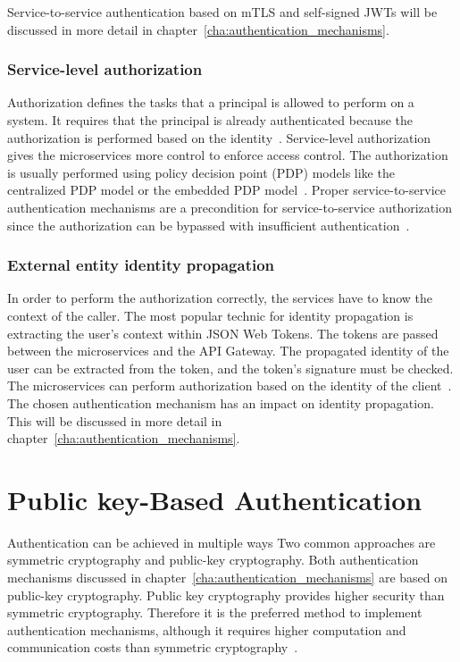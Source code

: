 Service-to-service authentication based on mTLS and self-signed JWTs will be discussed in more detail in chapter~\ref{cha:authentication_mechanisms}.

\subsubsection{Service-level authorization} 
\label{sec:service-level-authorization}
Authorization defines the tasks that a principal is allowed to perform on a system.
It requires that the principal is already authenticated because the authorization is performed based on the identity~\cite{siriwardena2014advanced}. 
Service-level authorization gives the microservices more control to enforce access control.
The authorization is usually performed using policy decision point (PDP) models like the centralized PDP model or the embedded PDP model~\cite{dias2020microservices, barabanov2020authentication}.
Proper service-to-service authentication mechanisms are a precondition for service-to-service authorization since the authorization can be bypassed with insufficient authentication~\cite{siriwardena2014advanced}.

\subsubsection{External entity identity propagation} 
\label{sec:external-entity-identity-propagation}
In order to perform the authorization correctly, the services have to know the context of the caller.
The most popular technic for identity propagation is extracting the user's context within JSON Web Tokens.
The tokens are passed between the microservices and the API Gateway.
The propagated identity of the user can be extracted from the token, and the token's signature must be checked.
The microservices can perform authorization based on the identity of the client~\cite{barabanov2020authentication, dias2020microservices}.
The chosen authentication mechanism has an impact on identity propagation. This will be discussed in more detail in chapter~\ref{cha:authentication_mechanisms}.

\section{Public key-Based Authentication}
Authentication can be achieved in multiple ways 
Two common approaches are symmetric cryptography and public-key cryptography.
Both authentication mechanisms discussed in chapter~\ref{cha:authentication_mechanisms} are based on public-key cryptography.
Public key cryptography provides higher security than symmetric cryptography.
Therefore it is the preferred method to implement authentication mechanisms, although it requires higher computation and communication costs than symmetric cryptography~\cite{pubkeycrypto}.

